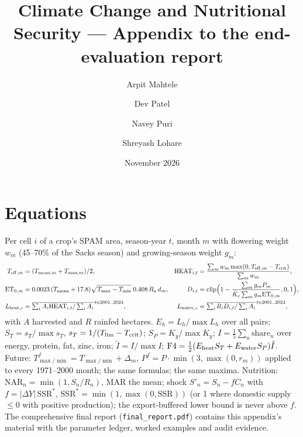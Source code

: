 \documentclass[10pt,a4paper]{article}
\title{Climate Change and Nutritional Security --- Appendix to the end-evaluation report}
\author{Arpit Mahtele \and Dev Patel \and Navey Puri \and Shreyash Lohare}
\date{November 2026}
\begin{document}
\maketitle
\tableofcontents

\section{Equations}
Per cell $i$ of a crop's SPAM area, season-year $t$, month $m$ with flowering weight $w_m$ (45--70\% of the
Sacks season) and growing-season weight $g_m$:
\begin{align*}
T_{\mathrm{eff}}{}_{,m} &= (T_{\text{mean},m}+T_{\max,m})/2, &
\text{HEAT}_{i,t} &= \frac{\sum_m w_m\max(0,T_{\mathrm{eff}}{}_{,m}-T_{\mathrm{crit}})}{\sum_m w_m},\\
\mathrm{ET_0}{}_{,m} &= 0.0023\,(T_{\text{mean}}+17.8)\sqrt{T_{\max}-T_{\min}}\;0.408\,R_a\,d_m, &
D_{i,t} &= \operatorname{clip}\!\Big(1-\frac{\sum_m g_m P_m}{\bar K_c\sum_m g_m\mathrm{ET_0}{}_{,m}},0,1\Big),\\
L_{\text{heat},c} &= \overline{\textstyle\sum_i A_i\text{HEAT}_{i,t}/\sum_i A_i}^{\,t\in2001..2024}, &
L_{\text{water},c} &= \overline{\textstyle\sum_i R_i D_{i,t}/\sum_i A_i}^{\,t\in2001..2024},
\end{align*}
with $A$ harvested and $R$ rainfed hectares. $E_h = L_h/\max L_h$ over all pairs; $S_T = s_T/\max s_T$,
$s_T = 1/(T_{\lim}-T_{\mathrm{crit}})$; $S_P = K_y/\max K_y$; $I = \frac15\sum_n \text{share}_n$ over energy, protein,
fat, zinc, iron; $\tilde I = I/\max I$; $\mathrm{F4} = \tfrac12(E_{\text{heat}}S_T + E_{\text{water}}S_P)\tilde I$.
Future: $T^{f}_{\max/\min} = T_{\max/\min} + \Delta_m$, $P^f = P\cdot\min(3,\max(0,r_m))$ applied to every
1971--2000 month; the same formulas; the same maxima. Nutrition: $\text{NAR}_n=\min(1,S_n/R_n)$, MAR the mean;
shock $S'_n = S_n - f C_n$ with $f = |\Delta Y|\,\text{SSR}^{*}$, $\text{SSR}^{*}=\min(1,\max(0,\text{SSR}))$ (or 1 where
domestic supply $\le 0$ with positive production); the export-buffered lower bound is never above $f$.
The comprehensive final report (\texttt{final\_report.pdf}) contains this appendix's material with the parameter
ledger, worked examples and audit evidence.
\end{document}
